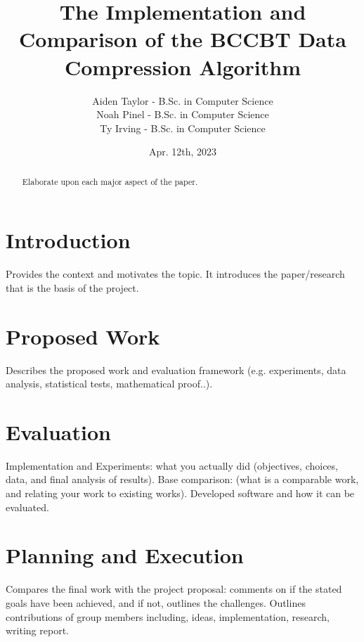 \documentclass[12pt]{IEEEtran}
\newcommand{\Aiden}{Aiden Taylor - B.Sc. in Computer Science}
\newcommand{\Noah}{Noah Pinel - B.Sc. in Computer Science}
\newcommand{\Ty}{Ty Irving - B.Sc. in Computer Science}
\begin{document}
\title{The Implementation and Comparison of the BCCBT Data Compression Algorithm}
\author{
\begin{tabular}{l}
    \Aiden \\ \Noah\\ \Ty\\ 
\end{tabular}}
\date{Apr. 12th, 2023}

\maketitle

\begin{abstract}
Elaborate upon each major aspect of the paper.
\end{abstract}

\section{Introduction}
Provides the context and motivates the topic. It introduces the paper/research that is the basis of the project. \cite{Sjostrand}


\section{Proposed Work}
Describes the proposed work and evaluation framework (e.g. experiments, data analysis, statistical tests, mathematical proof..).


\section{Evaluation}
Implementation and Experiments: what you actually did (objectives, choices, data, and final analysis of results).
Base comparison: (what is a comparable work, and relating your work to existing works).
Developed software and how it can be evaluated.


\section{Planning and Execution}
Compares the final work with the project proposal: comments on if the stated goals have been achieved, and if not, outlines the challenges.
Outlines contributions of group members including, ideas, implementation, research, writing report.



\end{document}
